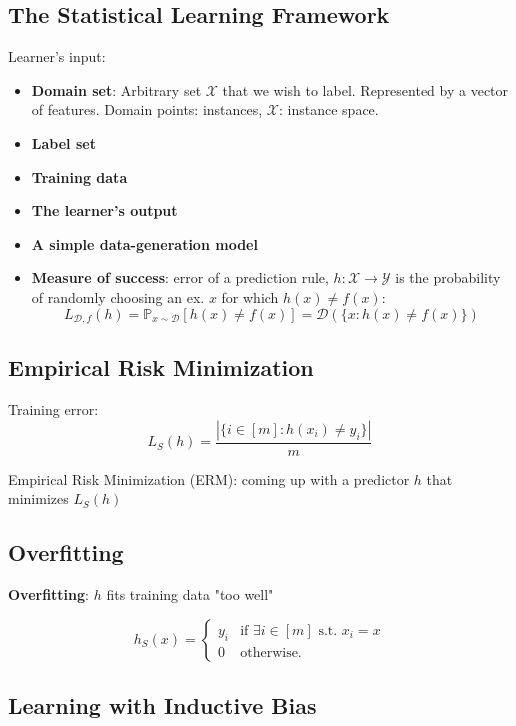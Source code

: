 \subsection{The Statistical Learning Framework}

Learner's input:
\begin{itemize}
    \item \textbf{Domain set}: Arbitrary set $\mathcal{X}$ that we wish to label. Represented by a vector of features. Domain points: instances, $\mathcal{X}$: instance space.
    \item \textbf{Label set}
    \item \textbf{Training data}
    \item \textbf{The learner's output}
    \item \textbf{A simple data-generation model}
    \item \textbf{Measure of success}: error of a prediction rule, $h : \mathcal{X} \rightarrow \mathcal{Y}$ is the probability of randomly choosing an ex. $x$ for which $h(x) \neq f(x)$:
    $$L_{\mathcal{D}, f}(h) = \mathbb{P}_{x \sim \mathcal{D}} [h(x) \neq f(x)] = \mathcal{D}(\{x:h(x) \neq f(x)\})$$
    
\end{itemize}

\subsection{Empirical Risk Minimization}

Training error: 
$$L_S(h) = \frac{|\{i \in [m] : h(x_i) \neq y_i \}|}{m}$$

Empirical Risk Minimization (ERM): coming up with a predictor $h$ that minimizes $L_S(h)$

\subsection{Overfitting}

\textbf{Overfitting}: $h$ fits training data "too well"

\begin{equation*}
    h_S(x) = 
    \begin{cases}
        y_i & \text{if } \exists i \in [m] \text{ s.t. } x_i = x \\
        0 & \text{otherwise.}
    \end{cases}
\end{equation*}

\subsection{Learning with Inductive Bias}


